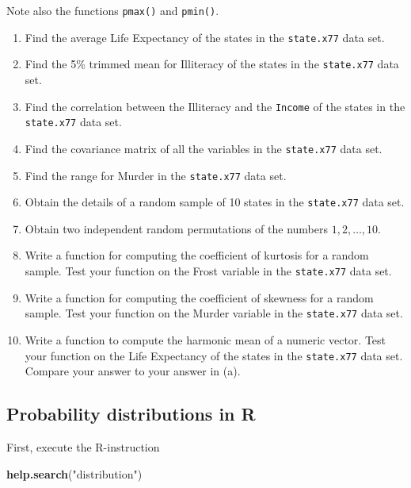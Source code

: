 \documentclass[
]{book}
\newenvironment{Shaded}{\begin{snugshade}}{\end{snugshade}}
\newcommand{\FunctionTok}[1]{\textcolor[rgb]{0.13,0.29,0.53}{\textbf{#1}}}
\newcommand{\NormalTok}[1]{#1}
\newcommand{\StringTok}[1]{\textcolor[rgb]{0.31,0.60,0.02}{#1}}
\providecommand{\tightlist}{%
  \setlength{\itemsep}{0pt}\setlength{\parskip}{0pt}}
\begin{document}
Note also the functions \texttt{pmax()} and \texttt{pmin()}.

\begin{enumerate}
\def\labelenumi{(\alph{enumi})}
\tightlist
\item
  Find the average Life Expectancy of the states in the \texttt{state.x77} data set.
\item
  Find the 5\% trimmed mean for Illiteracy of the states in the \texttt{state.x77} data set.
\item
  Find the correlation between the Illiteracy and the \texttt{Income} of the states in the \texttt{state.x77} data set.
\item
  Find the covariance matrix of all the variables in the \texttt{state.x77} data set.
\item
  Find the range for Murder in the \texttt{state.x77} data set.
\item
  Obtain the details of a random sample of 10 states in the \texttt{state.x77} data set.
\item
  Obtain two independent random permutations of the numbers \(1, 2, \dots, 10\).
\item
  Write a function for computing the coefficient of kurtosis for a random sample. Test your function on the Frost variable in the \texttt{state.x77} data set.
\item
  Write a function for computing the coefficient of skewness for a random sample. Test your function on the Murder variable in the \texttt{state.x77} data set.
\item
  Write a function to compute the harmonic mean of a numeric vector. Test your function on the Life Expectancy of the states in the \texttt{state.x77} data set. Compare your answer to your answer in (a).
\end{enumerate}

\subsection{Probability distributions in R}\label{probability-distributions-in-r}

First, execute the R-instruction

\begin{Shaded}
\begin{Highlighting}[]
\FunctionTok{help.search}\NormalTok{(}\StringTok{"distribution"}\NormalTok{)}
\end{Highlighting}
\end{Shaded}
\end{document}

